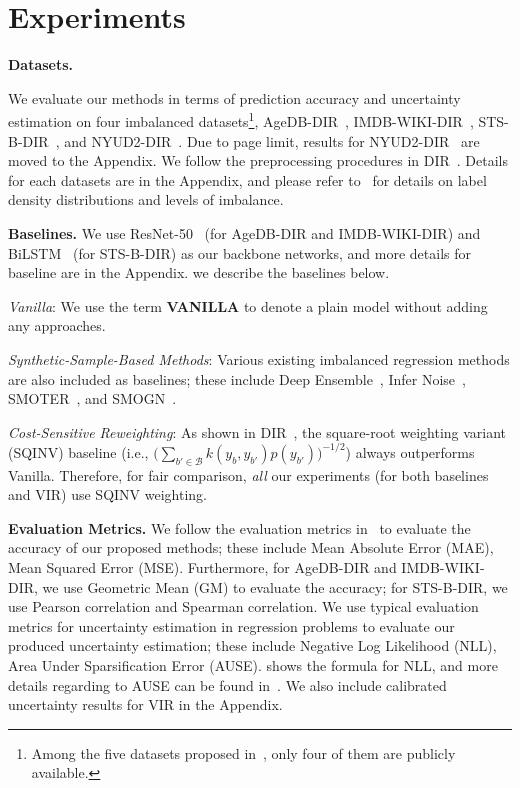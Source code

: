 \section{Experiments}\label{sec:exp}
\textbf{Datasets.} {We evaluate our methods in terms of prediction accuracy and uncertainty estimation on four imbalanced datasets\footnote{Among the five datasets proposed in~\citep{DIR}, only four of them are publicly available.}, AgeDB-DIR~\citep{AGEDB}, IMDB-WIKI-DIR~\citep{IMDBWIKI}, STS-B-DIR~\citep{STS-B}, and NYUD2-DIR~\citep{NYUD2}. {Due to page limit, results for NYUD2-DIR~\citep{NYUD2} are moved to the Appendix. We follow the preprocessing procedures in DIR~\citep{DIR}. Details for each datasets are in the Appendix, and please refer to~\citep{DIR} for details on label density distributions and levels of imbalance.}

{\textbf{Baselines.} %
We use ResNet-50~\citep{ResNet} (for AgeDB-DIR and IMDB-WIKI-DIR) and BiLSTM~\citep{bilstm} (for STS-B-DIR) as our backbone networks, and more details for baseline are in the Appendix. we describe the baselines below.}

\begin{compactitem}
\item \emph{Vanilla}: We use the term \textbf{VANILLA} to denote a plain model without adding any approaches.
\item {\emph{Synthetic-Sample-Based Methods}: Various existing imbalanced regression methods are also included as baselines; these include Deep Ensemble~\citep{DeepEnsemble}, Infer Noise~\citep{TFuncertainty}, SMOTER~\citep{IRrelated1}, and SMOGN~\citep{IRrelated2}.}
\item {\emph{Cost-Sensitive Reweighting}}: As shown in DIR~\citep{DIR}, the square-root weighting variant (SQINV) baseline {(i.e., $\big(\sum_{b' \in \mathcal{B}} k (y_b, y_{b'}) p(y_{b'})\big)^{-1/2}$)} always outperforms Vanilla. {Therefore, for fair comparison, \emph{all} our experiments (for both baselines and VIR) use SQINV weighting.} 
\end{compactitem}

\textbf{Evaluation Metrics.}
We follow the evaluation metrics in~\citep{DIR} to evaluate the accuracy of our proposed methods; these include Mean Absolute Error (MAE), Mean Squared Error (MSE). Furthermore, for AgeDB-DIR and IMDB-WIKI-DIR, we use Geometric Mean (GM) to evaluate the accuracy; for STS-B-DIR, we use Pearson correlation and Spearman correlation. We use typical evaluation metrics for uncertainty estimation in regression problems to evaluate our produced uncertainty estimation; these include Negative Log Likelihood (NLL), Area Under Sparsification Error (AUSE).  shows the formula for NLL, and more details regarding to AUSE can be found in~\citep{AUSE}. We also include calibrated uncertainty results for VIR in the Appendix.

}
